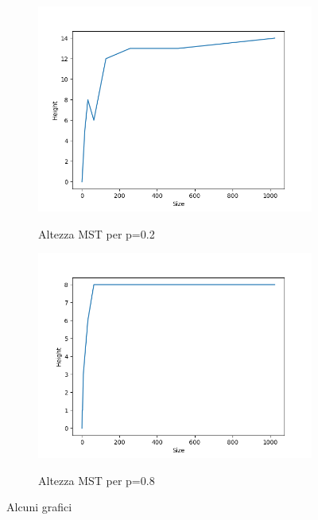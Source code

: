 \documentclass[]{article}
\begin{document}
\begin{figure}[H]
    \centering
    \begin{subfigure}[b]{0.45\linewidth} 
        \centering
        \caption{Altezza MST per p=0.2}
        \includegraphics[width=\textwidth]{krusk_height_p=02}
        \label{fig:krusk_height}
    \end{subfigure}
    \quad
    \begin{subfigure}[b]{0.45\linewidth}
        \centering
        \caption{Altezza MST per p=0.8}
        \includegraphics[width=\textwidth]{krusk_height_p=08}
        \label{fig:krusk_height}
    \end{subfigure}
    \caption{Alcuni grafici}
    \label{fig:mst_height}
\end{figure}
\newpage
\end{document}
